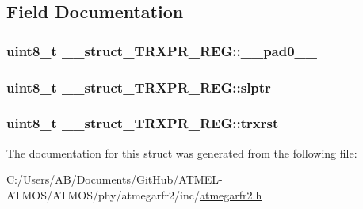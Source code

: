 \subsection{Field Documentation}
\hypertarget{struct____struct___t_r_x_p_r___r_e_g_aa69994dc09d933472ce116e5f2c66311}{
\subsubsection[{\-\_\-\-\_\-pad0\-\_\-\-\_\-}]{\setlength{\rightskip}{0pt plus 5cm}uint8\-\_\-t \-\_\-\-\_\-struct\-\_\-\-T\-R\-X\-P\-R\-\_\-\-R\-E\-G\-::\-\_\-\-\_\-pad0\-\_\-\-\_\-}}\label{struct____struct___t_r_x_p_r___r_e_g_aa69994dc09d933472ce116e5f2c66311}
\hypertarget{struct____struct___t_r_x_p_r___r_e_g_ae0b2852895a8a841631cf1dafe4831fc}{
\subsubsection[{slptr}]{\setlength{\rightskip}{0pt plus 5cm}uint8\-\_\-t \-\_\-\-\_\-struct\-\_\-\-T\-R\-X\-P\-R\-\_\-\-R\-E\-G\-::slptr}}\label{struct____struct___t_r_x_p_r___r_e_g_ae0b2852895a8a841631cf1dafe4831fc}
\hypertarget{struct____struct___t_r_x_p_r___r_e_g_ae133f19ba214b1493f024e7a988b0c59}{
\subsubsection[{trxrst}]{\setlength{\rightskip}{0pt plus 5cm}uint8\-\_\-t \-\_\-\-\_\-struct\-\_\-\-T\-R\-X\-P\-R\-\_\-\-R\-E\-G\-::trxrst}}\label{struct____struct___t_r_x_p_r___r_e_g_ae133f19ba214b1493f024e7a988b0c59}


The documentation for this struct was generated from the following file\-:\begin{DoxyCompactItemize}
\item 
C\-:/\-Users/\-A\-B/\-Documents/\-Git\-Hub/\-A\-T\-M\-E\-L-\/\-A\-T\-M\-O\-S/\-A\-T\-M\-O\-S/phy/atmegarfr2/inc/\hyperlink{atmegarfr2_8h}{atmegarfr2.\-h}\end{DoxyCompactItemize}
